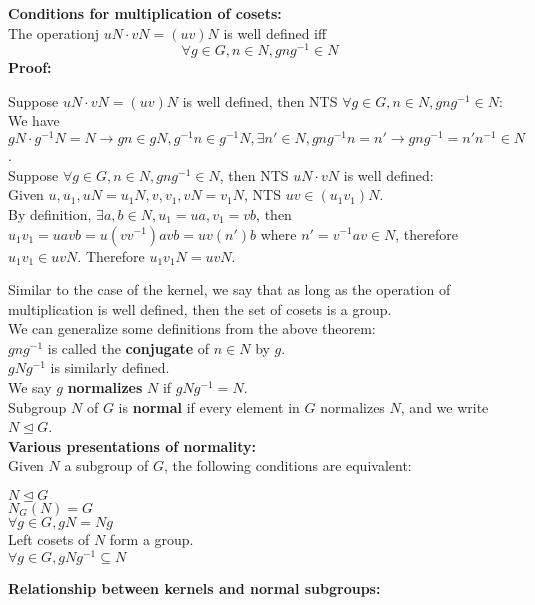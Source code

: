 \documentclass{article}
\begin{document}
\textbf{Conditions for multiplication of cosets:}\\
The operationj $uN \cdot vN = (uv)N$ is well defined iff
\begin{equation*}
    \forall g \in G, n \in N, gng^{-1} \in N
\end{equation*}
\textbf{Proof:}
\begin{addmargin}[1em]{0em}
Suppose $uN \cdot vN = (uv)N$ is well defined, then NTS $\forall g \in G, n \in N, gng^{-1} \in N$:\\
We have $gN \cdot g^{-1}N = N \rightarrow gn \in gN, g^{-1}n \in g^{-1}N, \exists n' \in N, gng^{-1}n = n' \rightarrow gng^{-1} = n'n^{-1} \in N$.\\
Suppose $\forall g \in G, n \in N, gng^{-1} \in N$, then NTS $uN \cdot vN$ is well defined:\\
Given $u, u_1, uN = u_1N, v, v_1, vN = v_1N$, NTS $uv \in (u_1v_1)N$.\\
By definition, $\exists a, b \in N, u_1 = ua, v_1 = vb$, then $u_1v_1 = uavb = u(vv^{-1})avb = uv(n')b$ where $n' = v^{-1}av \in N$, therefore $u_1v_1 \in uvN$. Therefore $u_1v_1N = uvN$.
\end{addmargin}
Similar to the case of the kernel, we say that as long as the operation of multiplication is well defined, then the set of cosets is a group.\\
We can generalize some definitions from the above theorem:\\
$gng^{-1}$ is called the \textbf{conjugate} of $n \in N$ by $g$.\\
$gNg^{-1}$ is similarly defined.\\
We say $g$ \textbf{normalizes} $N$ if $gNg^{-1} = N$.\\
Subgroup $N$ of $G$ is \textbf{normal} if every element in $G$ normalizes $N$, and we write $N \trianglelefteq G$.\\
\textbf{Various presentations of normality:}\\
Given $N$ a subgroup of $G$, the following conditions are equivalent:
\begin{addmargin}[1em]{0em}
$N \trianglelefteq G$\\
$N_G(N) = G$\\
$\forall g \in G, gN = Ng$\\
Left cosets of $N$ form a group.\\
$\forall g \in G, gNg^{-1} \subseteq N$
\end{addmargin}
\textbf{Relationship between kernels and normal subgroups:}\\
\end{document}
